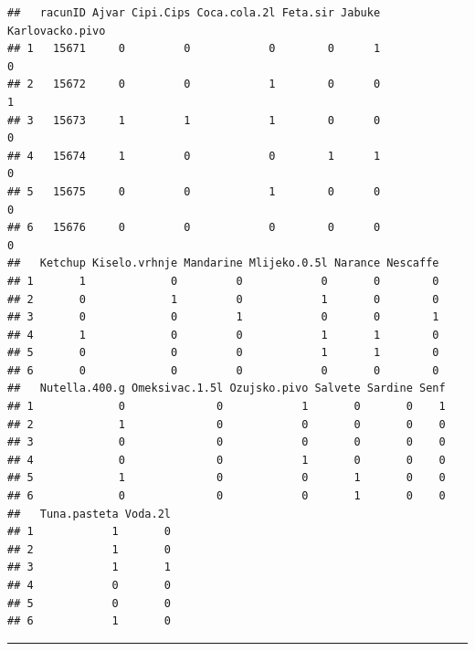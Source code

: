 \documentclass[]{book}
\newenvironment{Shaded}{\begin{snugshade}}{\end{snugshade}}
\newcommand{\KeywordTok}[1]{\textcolor[rgb]{0.13,0.29,0.53}{\textbf{#1}}}
\newcommand{\DataTypeTok}[1]{\textcolor[rgb]{0.13,0.29,0.53}{#1}}
\newcommand{\DecValTok}[1]{\textcolor[rgb]{0.00,0.00,0.81}{#1}}
\newcommand{\StringTok}[1]{\textcolor[rgb]{0.31,0.60,0.02}{#1}}
\newcommand{\OperatorTok}[1]{\textcolor[rgb]{0.81,0.36,0.00}{\textbf{#1}}}
\newcommand{\NormalTok}[1]{#1}
\theoremstyle{definition}
\theoremstyle{definition}
\theoremstyle{definition}
\theoremstyle{remark}
\begin{document}
\begin{Shaded}
\end{Shaded}

\begin{verbatim}
##   racunID Ajvar Cipi.Cips Coca.cola.2l Feta.sir Jabuke Karlovacko.pivo
## 1   15671     0         0            0        0      1               0
## 2   15672     0         0            1        0      0               1
## 3   15673     1         1            1        0      0               0
## 4   15674     1         0            0        1      1               0
## 5   15675     0         0            1        0      0               0
## 6   15676     0         0            0        0      0               0
##   Ketchup Kiselo.vrhnje Mandarine Mlijeko.0.5l Narance Nescaffe
## 1       1             0         0            0       0        0
## 2       0             1         0            1       0        0
## 3       0             0         1            0       0        1
## 4       1             0         0            1       1        0
## 5       0             0         0            1       1        0
## 6       0             0         0            0       0        0
##   Nutella.400.g Omeksivac.1.5l Ozujsko.pivo Salvete Sardine Senf
## 1             0              0            1       0       0    1
## 2             1              0            0       0       0    0
## 3             0              0            0       0       0    0
## 4             0              0            1       0       0    0
## 5             1              0            0       1       0    0
## 6             0              0            0       1       0    0
##   Tuna.pasteta Voda.2l
## 1            1       0
## 2            1       0
## 3            1       1
## 4            0       0
## 5            0       0
## 6            1       0
\end{verbatim}

\begin{center}\rule{0.5\linewidth}{\linethickness}\end{center}
\end{document}
